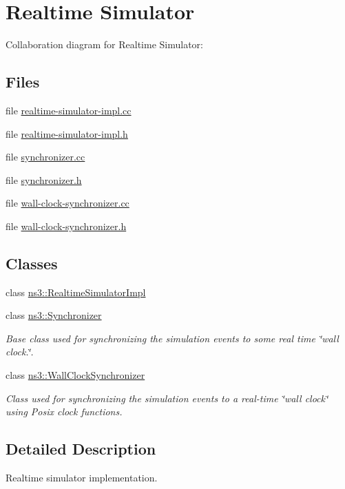 \hypertarget{group__realtime}{}\section{Realtime Simulator}
\label{group__realtime}
Collaboration diagram for Realtime Simulator\+:
\subsection*{Files}
\begin{DoxyCompactItemize}
\item 
file \hyperlink{realtime-simulator-impl_8cc}{realtime-\/simulator-\/impl.\+cc}
\item 
file \hyperlink{realtime-simulator-impl_8h}{realtime-\/simulator-\/impl.\+h}
\item 
file \hyperlink{synchronizer_8cc}{synchronizer.\+cc}
\item 
file \hyperlink{synchronizer_8h}{synchronizer.\+h}
\item 
file \hyperlink{wall-clock-synchronizer_8cc}{wall-\/clock-\/synchronizer.\+cc}
\item 
file \hyperlink{wall-clock-synchronizer_8h}{wall-\/clock-\/synchronizer.\+h}
\end{DoxyCompactItemize}
\subsection*{Classes}
\begin{DoxyCompactItemize}
\item 
class \hyperlink{classns3_1_1RealtimeSimulatorImpl}{ns3\+::\+Realtime\+Simulator\+Impl}
\item 
class \hyperlink{classns3_1_1Synchronizer}{ns3\+::\+Synchronizer}
\begin{DoxyCompactList}\small\item\em Base class used for synchronizing the simulation events to some real time \char`\"{}wall clock.\char`\"{}. \end{DoxyCompactList}\item 
class \hyperlink{classns3_1_1WallClockSynchronizer}{ns3\+::\+Wall\+Clock\+Synchronizer}
\begin{DoxyCompactList}\small\item\em Class used for synchronizing the simulation events to a real-\/time \char`\"{}wall clock\char`\"{} using Posix clock functions. \end{DoxyCompactList}\end{DoxyCompactItemize}


\subsection{Detailed Description}
Realtime simulator implementation. 
